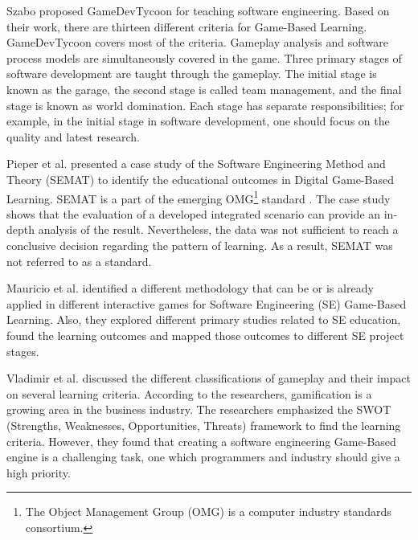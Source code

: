 Szabo \cite{gamedev} proposed GameDevTycoon for teaching software engineering. Based on their work, there are thirteen different criteria for Game-Based Learning. GameDevTycoon covers most of the criteria. Gameplay analysis and software process models are simultaneously covered in the game. Three primary stages of software development are taught through the gameplay. The initial stage is known as the garage, the second stage is called team management, and the final stage is known as world domination. Each stage has separate responsibilities; for example, in the initial stage in software development, one should focus on the quality and latest research.

Pieper et al. \cite{SEMAT} presented a case study of the Software Engineering Method and Theory (SEMAT) to identify the educational outcomes in Digital Game-Based Learning. SEMAT is a part of the emerging OMG\footnote{The Object Management Group (OMG) is a computer industry standards consortium.} standard \cite{kernerl}. The case study shows that the evaluation of a developed integrated scenario can provide an in-depth analysis of the result. Nevertheless, the data was not sufficient to reach a conclusive decision regarding the pattern of learning. As a result, SEMAT was not referred to as a standard.

Mauricio et al. \cite{gamesforlearning} identified a different methodology that can be or is already applied in different interactive games for Software Engineering (SE) Game-Based Learning. Also, they explored different primary studies related to SE education, found the learning outcomes and mapped those outcomes to different SE project stages. 

Vladimir et al. \cite{gamification} discussed the different classifications of gameplay and their impact on several learning criteria. According to the researchers, gamification is a growing area in the business industry. The researchers emphasized the SWOT (Strengths, Weaknesses, Opportunities, Threats) framework \cite{swot} to find the learning criteria. However, they found that creating a software engineering Game-Based engine is a challenging task, one which programmers and industry should give a high priority. 

